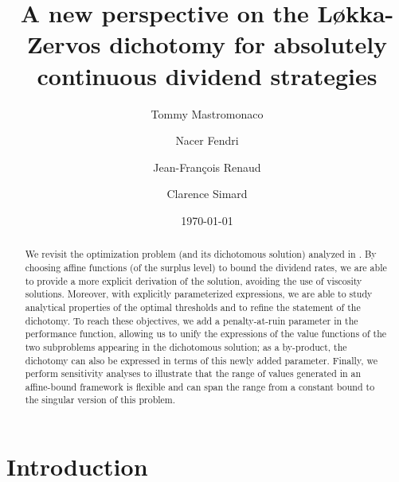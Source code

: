 \documentclass[11pt,reqno]{amsart}
\begin{document}
\title[L{\o}kka-Zervos dichotomy for AC dividend strategies]{A new perspective on the L{\o}kka-Zervos dichotomy for absolutely continuous dividend strategies}

\author[]{Tommy Mastromonaco }
\address{D\'epartement de math\'ematiques, Universit\'e du Qu\'ebec \`a Montr\'eal (UQAM), 201 av.\ Pr\'esident-Kennedy, Montr\'eal (Qu\'ebec) H2X 3Y7, Canada}

\author[]{Nacer Fendri}

\author[]{Jean-Fran\c{c}ois Renaud }

\author[]{Clarence Simard }


\date{\today}


\begin{abstract}
We revisit the optimization problem (and its dichotomous solution) analyzed in \cite{renaud-et-al_2023}. By choosing affine functions (of the surplus level) to bound the dividend rates, we are able to provide a more explicit derivation of the solution, avoiding the use of viscosity solutions. Moreover, with explicitly parameterized expressions, we are able to study analytical properties of the optimal thresholds and to refine the statement of the dichotomy. To reach these objectives, we add a penalty-at-ruin parameter in the performance function, allowing us to unify the expressions of the value functions of the two subproblems appearing in the dichotomous solution; as a by-product, the dichotomy can also be expressed in terms of this newly added parameter. Finally, we perform sensitivity analyses to illustrate that the range of values generated in an affine-bound framework is flexible and can span the range from a constant bound to the singular version of this problem.
\end{abstract}

\maketitle


\section{Introduction}
\end{document}
